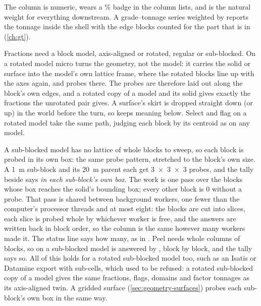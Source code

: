 The column is numeric, wears a \% badge in the column lists, and is the natural weight for everything downstream. A grade–tonnage series weighted by  reports the tonnage inside the shell with the edge blocks counted for the part that is in (\cref{ch:gt}).

\begin{note}
Fractions need a block model, axis-aligned or rotated, regular or sub-blocked. On a rotated model micro turns the geometry, not the model: it carries the solid or surface into the model's own lattice frame, where the rotated blocks line up with the axes again, and probes there. The probes are therefore laid out along the block's own edges, and a rotated copy of a model and its solid gives exactly the fractions the unrotated pair gives. A surface's skirt is dropped straight down (or up) in the world before the turn, so  keeps meaning below. Select and flag on a rotated model take the same path, judging each block by its centroid as on any model.
\end{note}

\begin{note}
A sub-blocked model has no lattice of whole blocks to sweep, so each block is probed in its own box: the same probe pattern, stretched to the block's own size. A 1~m sub-block and its 20~m parent each get 3~×~3~×~3 probes, and the tally beside  says \emph{in each sub-block's own box}. The work is one pass over the blocks whose box reaches the solid's bounding box; every other block is 0 without a probe. That pass is shared between background workers, one fewer than the computer's processor threads and at most eight: the blocks are cut into slices, each slice is probed whole by whichever worker is free, and the answers are written back in block order, so the column is the same however many workers made it. The status line says how many, as in . Peel needs whole columns of blocks, so on a sub-blocked model  is answered by , block by block, and the tally says so. All of this holds for a rotated sub-blocked model too, such as an Isatis or Datamine export with sub-cells, which used to be refused: a rotated sub-blocked copy of a model gives the same fractions, flags, domains and factor tonnages as its axis-aligned twin. A gridded surface (\cref{sec:geometry-surfaces}) probes each sub-block's own box in the same way.
\end{note}

